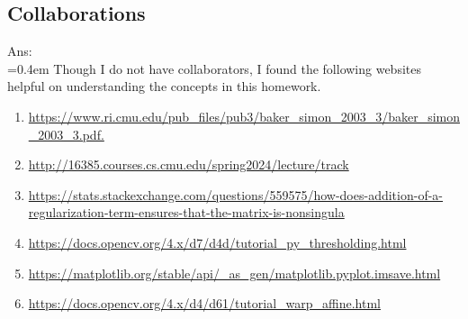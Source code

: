 \documentclass{article}
\begin{document}
	\subsection*{Collaborations}
	Ans:\\
	\hangindent=0.4em \hspace{0.3em} Though I do not have collaborators, I found the following websites helpful on understanding the concepts in this homework.
	\begin{enumerate}
		\item \url{https://www.ri.cmu.edu/pub_files/pub3/baker_simon_2003_3/baker_simon_2003_3.pdf.}
		\item \url{http://16385.courses.cs.cmu.edu/spring2024/lecture/track}
		\item \url{https://stats.stackexchange.com/questions/559575/how-does-addition-of-a-regularization-term-ensures-that-the-matrix-is-nonsingula}
		\item \url{https://docs.opencv.org/4.x/d7/d4d/tutorial_py_thresholding.html}
		\item \url{https://matplotlib.org/stable/api/_as_gen/matplotlib.pyplot.imsave.html}
		\item \url{https://docs.opencv.org/4.x/d4/d61/tutorial_warp_affine.html}		
	\end{enumerate}
\end{document}
